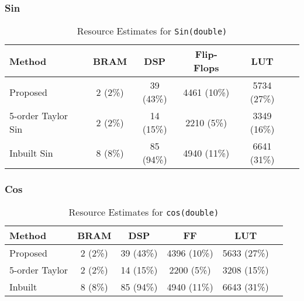 \documentclass[12pt,twoside, letterpaper, margin=1in]{article}
\begin{document}
\subsubsection{Sin}

\begin{table}[H]
  \centering
  \caption{Resource Estimates for \texttt{Sin(double)}}
  \small
  \begin{tabular}{lccccc}
    \toprule
    Method                & BRAM       & DSP         & Flip-Flops           & LUT          \\
    \midrule
    Proposed              & 2 (2\%)    & 39 (43\%)   & 4461 (10\%)  & 5734 (27\%)     \\
    5-order Taylor Sin    & 2 (2\%)    & 14 (15\%)   & 2210 (5\%)   & 3349 (16\%)     \\
    Inbuilt Sin           & 8 (8\%)    & 85 (94\%)   & 4940 (11\%)  & 6641 (31\%)    \\
    \bottomrule
  \end{tabular}
  \label{tab:sin_performance}
\end{table}


\subsubsection{Cos}

\begin{table}[H]
  \centering
  \caption{Resource Estimates for \texttt{cos(double)}}
  \small
  \begin{tabular}{lccccc}
    \toprule
    Method                & BRAM       & DSP         & FF            & LUT          \\
    \midrule
    Proposed              & 2 (2\%)    & 39 (43\%)   & 4396 (10\%)   & 5633 (27\%)    \\
    5-order Taylor        & 2 (2\%)    & 14 (15\%)   & 2200 (5\%)    & 3208 (15\%)     \\
    Inbuilt               & 8 (8\%)    & 85 (94\%)   & 4940 (11\%)   & 6643 (31\%)    \\
    \bottomrule
  \end{tabular}
  \label{tab:cos_performance}
\end{table}
\end{document}
